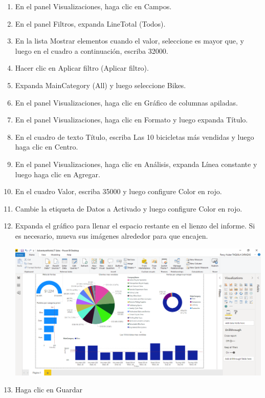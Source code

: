 \begin{enumerate}
    
    
    
    
    
    
    
 \item En el panel Visualizaciones, haga clic en Campos.
    \item En el panel Filtros, expanda LineTotal (Todos).
    \item En la lista Mostrar elementos cuando el valor, seleccione es mayor que, y luego en el cuadro a continuación, escriba 32000.


    \item Hacer clic en Aplicar filtro (Aplicar filtro).
    \item Expanda MainCategory (All) y luego seleccione Bikes.  
    \item En el panel Visualizaciones, haga clic en Gráfico de columnas apiladas.   
    
    
    
      \item En el panel Visualizaciones, haga clic en Formato y luego expanda Título.
    \item En el cuadro de texto Título, escriba Las 10 bicicletas más vendidas y luego haga clic en Centro.


    \item En el panel Visualizaciones, haga clic en Análisis, expanda Línea constante y luego haga clic en Agregar.
    \item En el cuadro Valor, escriba 35000 y luego configure Color en rojo.  
    \item Cambie la etiqueta de Datos a Activado y luego configure Color en rojo.
    
       \item Expanda el gráfico para llenar el espacio restante en el lienzo del informe. Si es necesario, mueva sus imágenes alrededor para que encajen.  
           \begin{center}
	\includegraphics[width=13cm]{./Imagenes/12}
	\end{center}
       
       
       
    \item Haga clic en Guardar
    
    
    


\end{enumerate}



